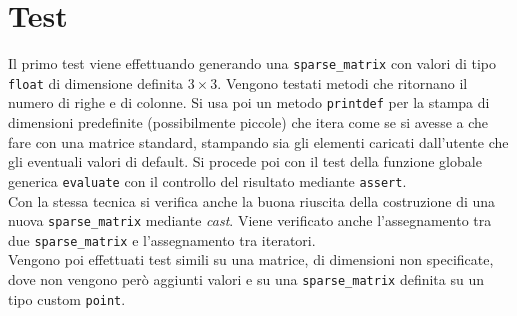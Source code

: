 \documentclass[a4paper,12pt, oneside]{article}
\begin{document}
\section*{Test}
Il primo test viene effettuando generando una \texttt{sparse\_matrix}
con valori di tipo \texttt{float} di dimensione definita $3\times
3$. Vengono testati metodi che ritornano il numero di righe e di
colonne. Si usa poi un metodo \texttt{printdef} per la stampa di
dimensioni predefinite (possibilmente piccole) che itera come se si
avesse a che fare con una matrice standard, stampando sia gli elementi
caricati dall'utente che gli eventuali valori di default. Si procede
poi con il test della funzione globale generica \texttt{evaluate} con
il controllo del risultato mediante \texttt{assert}.\\
Con la stessa tecnica si verifica anche la buona riuscita della
costruzione di una nuova \texttt{sparse\_matrix} mediante
\textit{cast}. Viene verificato anche l'assegnamento tra due
\texttt{sparse\_matrix} e l'assegnamento tra iteratori.\\
Vengono poi effettuati test simili su una matrice, di dimensioni non
specificate, dove non vengono però aggiunti valori e su una
\texttt{sparse\_matrix} definita su un tipo custom \texttt{point}.
\end{document}

